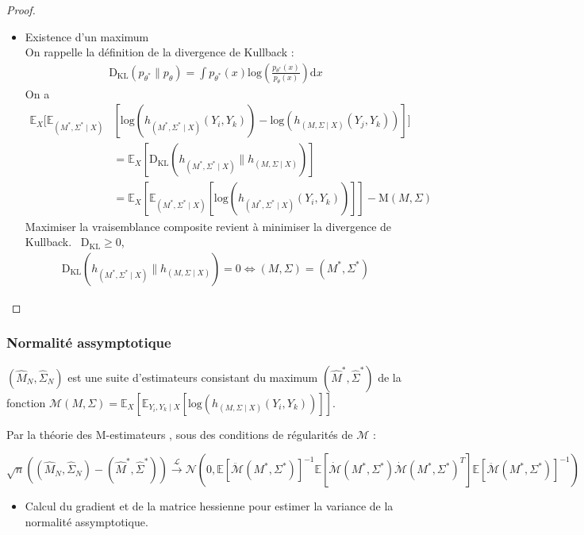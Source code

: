 \documentclass[11pt,table]{beamer}
\begin{document}
\begin{frame}
\begin{proof}
\begin{itemize}
\item Existence d'un maximum \\
On rappelle la définition de la divergence de Kullback :
\begin{align*}
\mathrm{D_{KL}}(p_{\theta^\ast} \parallel p_{\theta})= \int p_{\theta^\ast}(x) \mathrm{log}(\frac{p_{\theta^\ast}(x)}{p_{\theta}(x)}) \mathrm{d}x
\end{align*}
On a 
\begin{align*}
\mathbb{E}_X[\mathbb{E}_{(M^{\ast},\Sigma^{\ast} \mid X)}&[\mathrm{log}(h_{(M^{\ast},\Sigma^{\ast} \mid X)}(Y_i,Y_k)) - \mathrm{log}(h_{(M,\Sigma\mid X)}(Y_j,Y_k))]] \\
& = \mathbb{E}_X[\mathrm{D_{KL}}(h_{(M^\ast,\Sigma^\ast \mid X)}\parallel h_{(M,\Sigma \mid X)})]\\
& = \mathbb{E}_X[\mathbb{E}_{(M^{\ast},\Sigma^{\ast} \mid X)}[\mathrm{log}(h_{(M^{\ast},\Sigma^{\ast} \mid X)}(Y_i,Y_k))]] - \mathrm{M}(M,\Sigma)
\end{align*}
Maximiser la vraisemblance composite revient à minimiser la divergence de Kullback. \
$\mathrm{D_{KL}} \geq 0$, 
\begin{align*}
\mathrm{D_{KL}}(h_{(M^\ast,\Sigma^\ast \mid X)}\parallel h_{(M,\Sigma \mid X)}) = 0 
\Leftrightarrow
(M,\Sigma) = (M^\ast, \Sigma^\ast)
\end{align*}

\end{itemize}
\end{proof}
\end{frame}
\begin{frame}
\frametitle{Normalité assymptotique}
 $(\widehat{M}_N,\widehat\Sigma_N)$ est une suite d'estimateurs consistant du maximum $(\widehat{M}^\ast,\widehat{\Sigma}^\ast)$ de la fonction $\mathcal{M}(M,\Sigma) = \mathbb{E}_X [\mathbb{E}_{Y_i,Y_k \mid X} [ \mathrm{log}(h_{(M,\Sigma \mid X)} (Y_i,Y_k))]]$.\\
\vspace{0.5cm}
 
Par la théorie des M-estimateurs \cite{vaart_1998}, sous des conditions de régularités de $\mathcal{M}$ :\\
\begin{center}
$ \sqrt{n}((\widehat{M}_N,\widehat\Sigma_N) - (\widehat{M}^\ast,\widehat{\Sigma}^\ast)) \overset{\mathcal{L}}{\longrightarrow} \mathcal{N}(0, \mathbb{E}[\ddot{\mathcal{M}}(M^\ast, \Sigma^\ast)]^{-1} \mathbb{E}[ \dot{\mathcal{M}}(M^\ast,\Sigma^\ast) \dot{\mathcal{M}}(M^\ast,\Sigma^\ast)^T ]\mathbb{E}[\ddot{\mathcal{M}}(M^\ast, \Sigma^\ast)]^{-1} ) $
\end{center}
\begin{itemize}
\item Calcul du gradient et de la matrice hessienne pour estimer la variance de la normalité assymptotique.
\end{itemize}
 
\end{frame}
\end{document}
